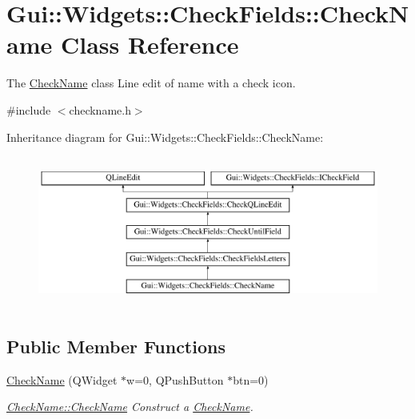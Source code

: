 \hypertarget{classGui_1_1Widgets_1_1CheckFields_1_1CheckName}{}\section{Gui\+:\+:Widgets\+:\+:Check\+Fields\+:\+:Check\+Name Class Reference}
\label{classGui_1_1Widgets_1_1CheckFields_1_1CheckName}


The \hyperlink{classGui_1_1Widgets_1_1CheckFields_1_1CheckName}{Check\+Name} class Line edit of name with a check icon.  




{\ttfamily \#include $<$checkname.\+h$>$}

Inheritance diagram for Gui\+:\+:Widgets\+:\+:Check\+Fields\+:\+:Check\+Name\+:\begin{figure}[H]
\begin{center}
\leavevmode
\includegraphics[height=5.000000cm]{da/d67/classGui_1_1Widgets_1_1CheckFields_1_1CheckName}
\end{center}
\end{figure}
\subsection*{Public Member Functions}
\begin{DoxyCompactItemize}
\item 
\hyperlink{classGui_1_1Widgets_1_1CheckFields_1_1CheckName_a1a75917c490d7b8e948e76a1c1c5210b}{Check\+Name} (Q\+Widget $\ast$w=0, Q\+Push\+Button $\ast$btn=0)
\begin{DoxyCompactList}\small\item\em \hyperlink{classGui_1_1Widgets_1_1CheckFields_1_1CheckName_a1a75917c490d7b8e948e76a1c1c5210b}{Check\+Name\+::\+Check\+Name} Construct a \hyperlink{classGui_1_1Widgets_1_1CheckFields_1_1CheckName}{Check\+Name}. \end{DoxyCompactList}\end{DoxyCompactItemize}
